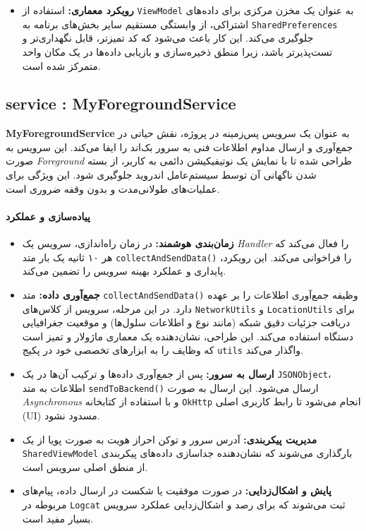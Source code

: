 \documentclass{report}
\begin{document}
\begin{itemize}
\begin{itemize}
	\end{itemize} 	
	\item \textbf{رویکرد معماری:} استفاده از \texttt{ViewModel} به عنوان یک مخزن مرکزی برای داده‌های اشتراکی، از وابستگی مستقیم سایر بخش‌های برنامه به \texttt{SharedPreferences} جلوگیری می‌کند. این کار باعث می‌شود که کد تمیزتر، قابل نگهداری‌تر و تست‌پذیرتر باشد، زیرا منطق ذخیره‌سازی و بازیابی داده‌ها در یک مکان واحد متمرکز شده است.
\end{itemize}

\subsection{ service :  MyForegroundService}

\textbf{MyForegroundService} به عنوان یک سرویس پس‌زمینه در پروژه، نقش حیاتی در جمع‌آوری و ارسال مداوم اطلاعات فنی به سرور بک‌اند را ایفا می‌کند. این سرویس به صورت \textit{Foreground} طراحی شده تا با نمایش یک نوتیفیکیشن دائمی به کاربر، از بسته شدن ناگهانی آن توسط سیستم‌عامل اندروید جلوگیری شود. این ویژگی برای عملیات‌های طولانی‌مدت و بدون وقفه ضروری است.

\paragraph{پیاده‌سازی و عملکرد}

\begin{itemize}
	\item\textbf{زمان‌بندی هوشمند:} در زمان راه‌اندازی، سرویس یک \textit{Handler} را فعال می‌کند که هر ۱۰ ثانیه یک بار متد \texttt{collectAndSendData()} را فراخوانی می‌کند. این رویکرد، پایداری و عملکرد بهینه سرویس را تضمین می‌کند.
	
	\item\textbf{جمع‌آوری داده:} متد \texttt{collectAndSendData()} وظیفه جمع‌آوری اطلاعات را بر عهده دارد. در این مرحله، سرویس از کلاس‌های \texttt{NetworkUtils} و \texttt{LocationUtils} برای دریافت جزئیات دقیق شبکه (مانند نوع و اطلاعات سلول‌ها) و موقعیت جغرافیایی دستگاه استفاده می‌کند. این طراحی، نشان‌دهنده یک معماری ماژولار و تمیز است که وظایف را به ابزارهای تخصصی خود در پکیج \texttt{utils} واگذار می‌کند.
	
	\item\textbf{ارسال به سرور:} پس از جمع‌آوری داده‌ها و ترکیب آن‌ها در یک \texttt{JSONObject}، اطلاعات به متد \texttt{sendToBackend()} ارسال می‌شود. این ارسال به صورت \textit{Asynchronous} و با استفاده از کتابخانه \texttt{OkHttp} انجام می‌شود تا رابط کاربری اصلی (UI) مسدود نشود.
	
	\item\textbf{مدیریت پیکربندی:} آدرس سرور و توکن احراز هویت به صورت پویا از یک \texttt{SharedViewModel} بارگذاری می‌شوند که نشان‌دهنده جداسازی داده‌های پیکربندی از منطق اصلی سرویس است.
	
	\item\textbf{پایش و اشکال‌زدایی:} در صورت موفقیت یا شکست در ارسال داده، پیام‌های مربوطه در \texttt{Logcat} ثبت می‌شوند که برای رصد و اشکال‌زدایی عملکرد سرویس بسیار مفید است.
\end{itemize}
\end{document}
